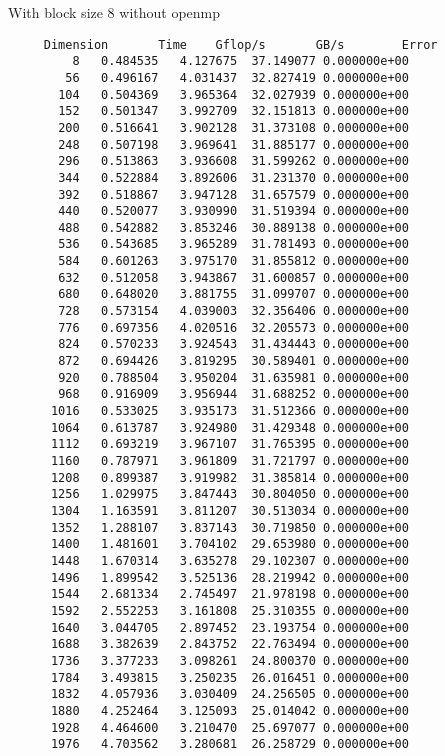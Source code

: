 \documentclass{article}
\begin{document}
With block size 8
without openmp
\begin{verbatim}
     Dimension       Time    Gflop/s       GB/s        Error
         8   0.484535   4.127675  37.149077 0.000000e+00
        56   0.496167   4.031437  32.827419 0.000000e+00
       104   0.504369   3.965364  32.027939 0.000000e+00
       152   0.501347   3.992709  32.151813 0.000000e+00
       200   0.516641   3.902128  31.373108 0.000000e+00
       248   0.507198   3.969641  31.885177 0.000000e+00
       296   0.513863   3.936608  31.599262 0.000000e+00
       344   0.522884   3.892606  31.231370 0.000000e+00
       392   0.518867   3.947128  31.657579 0.000000e+00
       440   0.520077   3.930990  31.519394 0.000000e+00
       488   0.542882   3.853246  30.889138 0.000000e+00
       536   0.543685   3.965289  31.781493 0.000000e+00
       584   0.601263   3.975170  31.855812 0.000000e+00
       632   0.512058   3.943867  31.600857 0.000000e+00
       680   0.648020   3.881755  31.099707 0.000000e+00
       728   0.573154   4.039003  32.356406 0.000000e+00
       776   0.697356   4.020516  32.205573 0.000000e+00
       824   0.570233   3.924543  31.434443 0.000000e+00
       872   0.694426   3.819295  30.589401 0.000000e+00
       920   0.788504   3.950204  31.635981 0.000000e+00
       968   0.916909   3.956944  31.688252 0.000000e+00
      1016   0.533025   3.935173  31.512366 0.000000e+00
      1064   0.613787   3.924980  31.429348 0.000000e+00
      1112   0.693219   3.967107  31.765395 0.000000e+00
      1160   0.787971   3.961809  31.721797 0.000000e+00
      1208   0.899387   3.919982  31.385814 0.000000e+00
      1256   1.029975   3.847443  30.804050 0.000000e+00
      1304   1.163591   3.811207  30.513034 0.000000e+00
      1352   1.288107   3.837143  30.719850 0.000000e+00
      1400   1.481601   3.704102  29.653980 0.000000e+00
      1448   1.670314   3.635278  29.102307 0.000000e+00
      1496   1.899542   3.525136  28.219942 0.000000e+00
      1544   2.681334   2.745497  21.978198 0.000000e+00
      1592   2.552253   3.161808  25.310355 0.000000e+00
      1640   3.044705   2.897452  23.193754 0.000000e+00
      1688   3.382639   2.843752  22.763494 0.000000e+00
      1736   3.377233   3.098261  24.800370 0.000000e+00
      1784   3.493815   3.250235  26.016451 0.000000e+00
      1832   4.057936   3.030409  24.256505 0.000000e+00
      1880   4.252464   3.125093  25.014042 0.000000e+00
      1928   4.464600   3.210470  25.697077 0.000000e+00
      1976   4.703562   3.280681  26.258729 0.000000e+00
\end{verbatim}
\end{document}

